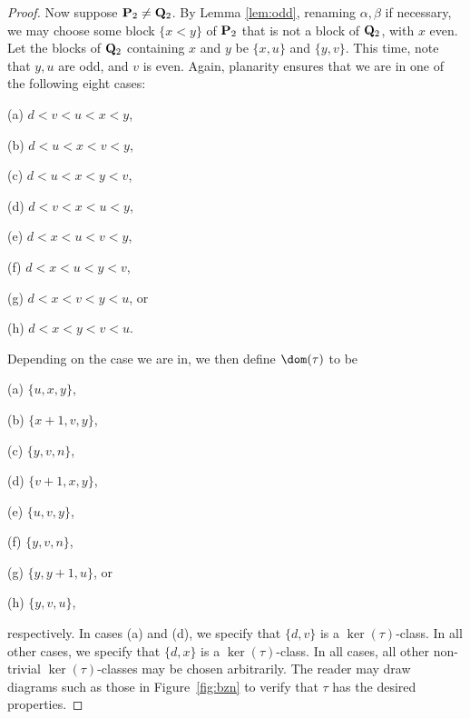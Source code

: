 \begin{proof}
\bigskip{}  Now suppose ${\bf P}_2\not={\bf Q}_2$.  By Lemma \ref{lem:odd}, renaming $\alpha,\beta$ if necessary, we may choose some block $\{x<y\}$ of ${\bf P}_2$ that is not a block of ${\bf Q}_2$, with $x$ even.  Let the blocks of ${\bf Q}_2$ containing $x$ and $y$ be $\{x,u\}$ and $\{y,v\}$.  This time, note that $y,u$ are odd, and $v$ is even.  Again, planarity ensures that we are in one of the following eight cases:
\begin{itemize}
\begin{multicols}{4}
\item[(a)] $d<v<u<x<y$,
\item[(b)] $d<u<x<v<y$,
\item[(c)] $d<u<x<y<v$,
\item[(d)] $d<v<x<u<y$,
\item[(e)] $d<x<u<v<y$,
\item[(f)] $d<x<u<y<v$, 
\item[(g)] $d<x<v<y<u$, or
\item[(h)] $d<x<y<v<u$.
\end{multicols}
\end{itemize}
Depending on the case we are in, we then define $\dom(\tau)$ to be
\begin{itemize}
\begin{multicols}{4}
\item[(a)] $\{u,x,y\}$,
\item[(b)] $\{x+1,v,y\}$,
\item[(c)] $\{y,v,n\}$,
\item[(d)] $\{v+1,x,y\}$, 
\item[(e)] $\{u,v,y\}$,
\item[(f)] $\{y,v,n\}$, 
\item[(g)] $\{y,y+1,u\}$, or
\item[(h)] $\{y,v,u\}$,
\end{multicols}
\end{itemize}
respectively.
In cases (a) and (d), we specify that $\{d,v\}$ is a $\ker(\tau)$-class.  In all other cases, we specify that $\{d,x\}$ is a $\ker(\tau)$-class.  In all cases, all other non-trivial $\ker(\tau)$-classes may be chosen arbitrarily.  The reader may draw diagrams such as those in Figure~\ref{fig:bzn} to verify that $\tau$ has the desired properties. \end{proof}








